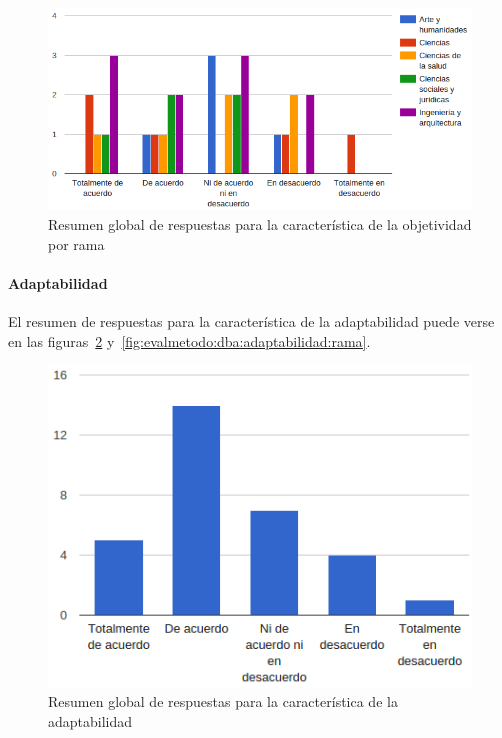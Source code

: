 \begin{figure}[h]
  \begin{center}
    \includegraphics[scale=0.45]{C_DBA_objetividad_rama.png}
  \end{center}
  \caption{Resumen global de respuestas para la característica de la objetividad por rama}
  \label{fig:evalmetodo:dba:objetividad:rama}
\end{figure}

\newpage
\paragraph*{Adaptabilidad}

El resumen de respuestas para la característica de la adaptabilidad puede verse en las figuras~\ref{fig:evalmetodo:dba:adaptabilidad} y~\ref{fig:evalmetodo:dba:adaptabilidad:rama}.

\begin{figure}[h]
  \begin{center}
    \includegraphics[scale=0.45]{C_DBA_adaptabilidad.png}
  \end{center}
  \caption{Resumen global de respuestas para la característica de la adaptabilidad}
  \label{fig:evalmetodo:dba:adaptabilidad}
\end{figure}

